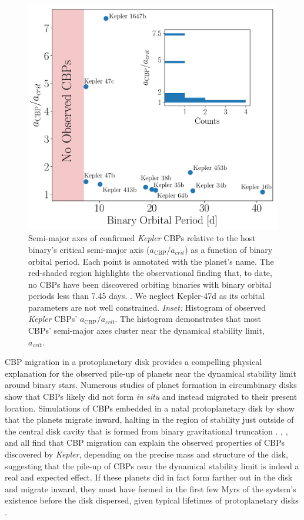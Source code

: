 \begin{figure}[]
	\includegraphics[width=\columnwidth]{observed_acrit.pdf}
    \caption{Semi-major axes of confirmed {\it Kepler} CBPs relative to the host binary's critical semi-major axis ($a_{\text{CBP}}/a_{crit}$) as a function of binary orbital period. Each point is annotated with the planet's name.  The red-shaded region highlights the observational finding that, to date, no CBPs have been discovered orbiting binaries with binary orbital periods less than 7.45 days. \citep{Welsh2014,Winn2015}.  We neglect Kepler-47d as its orbital parameters are not well constrained. {\it Inset:} Histogram of observed {\it Kepler} CBPs' $a_{\text{CBP}}/a_{crit}$.  The histogram demonstrates that most CBPs' semi-major axes cluster near the dynamical stability limit, $a_{crit}$.}
    \label{STEEP:fig:observed_acrit}
\end{figure}

CBP migration in a protoplanetary disk provides a compelling physical explanation for the observed pile-up of planets near the dynamical stability limit around binary stars.  Numerous studies of planet formation in circumbinary disks show that CBPs likely did not form {\it in situ} \citep[e.g.][]{Paardekooper2012,Meschiari2012a,Meschiari2012b,Pelupessy2013} and instead migrated to their present location.  Simulations of CBPs embedded in a natal protoplanetary disk by \citet{PierensNelson2007} show that the planets migrate inward, halting in the region of stability just outside of the central disk cavity that is formed from binary gravitational truncation \citep{Arty1994}.  \citet{Dunhill2013}, \citet{Pierens2013}, and \citet{Kley2014} all find that CBP migration can explain the observed properties of CBPs discovered by {\it Kepler}, depending on the precise mass and structure of the disk, suggesting that the pile-up of CBPs near the dynamical stability limit is indeed a real and expected effect.  If these planets did in fact form farther out in the disk and migrate inward, they must have formed in the first few Myrs of the system's existence before the disk dispersed, given typical lifetimes of protoplanetary disks \citep[e.g.][]{Haisch2001}.

